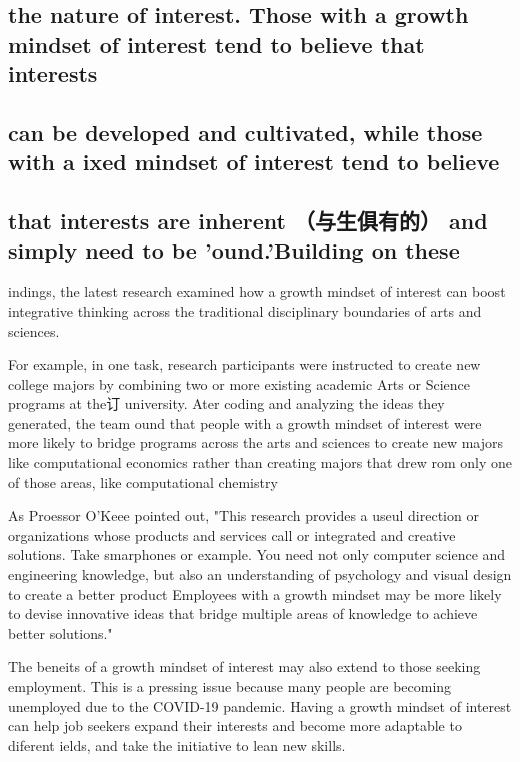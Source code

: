 \documentclass[UTF8,11pt]{ctexart}
\begin{document}
\subsection*{\textbf{the nature of interest. Those with a growth mindset of interest tend to believe that interests}}


\subsection*{\textbf{can be developed and cultivated, while those with a ixed mindset of interest tend to believe}}


\subsection*{\textbf{that interests are inherent （与生俱有的） and simply need to be 'ound.'Building on these}}


indings, the latest research examined how a growth mindset of interest can boost integrative thinking across the traditional disciplinary boundaries of arts and sciences.


For example, in one task, research participants were instructed to create new college majors by combining two or more existing academic Arts or Science programs at the订 university. Ater coding and analyzing the ideas they generated, the team ound that people with a growth mindset of interest were more likely to bridge programs across the arts and sciences to create new majors like computational economics rather than creating majors that drew rom only one of those areas, like computational chemistry


As Proessor O'Keee pointed out, "This research provides a useul direction or organizations whose products and services call or integrated and creative solutions. Take smarphones or example. You need not only computer science and engineering knowledge, but also an understanding of psychology and visual design to create a better product Employees with a growth mindset may be more likely to devise innovative ideas that bridge multiple areas of knowledge to achieve better solutions."


The beneits of a growth mindset of interest may also extend to those seeking employment. This is a pressing issue because many people are becoming unemployed due to the COVID-19 pandemic. Having a growth mindset of interest can help job seekers expand their interests and become more adaptable to diferent ields, and take the initiative to lean new skills.
\end{document}
